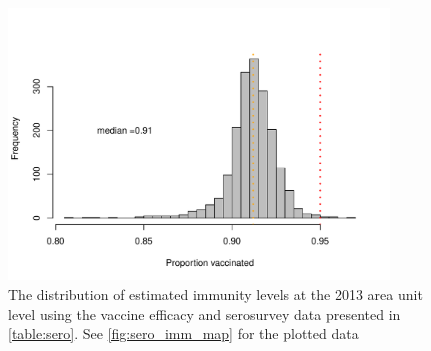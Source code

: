 \documentclass{article}
\begin{document}
\begin{figure}[H]
     \begin{center}
     \includegraphics[width=0.9\textwidth]{census_immunity_age_hist.pdf}
     \end{center}
     \caption{The distribution of estimated immunity levels at the 2013 area unit level using the vaccine efficacy and serosurvey data presented in \autoref{table:sero}. See \autoref{fig:sero_imm_map} for the plotted data}
     \label{fig:sero_imm_hist}
\end{figure}
\end{document}
